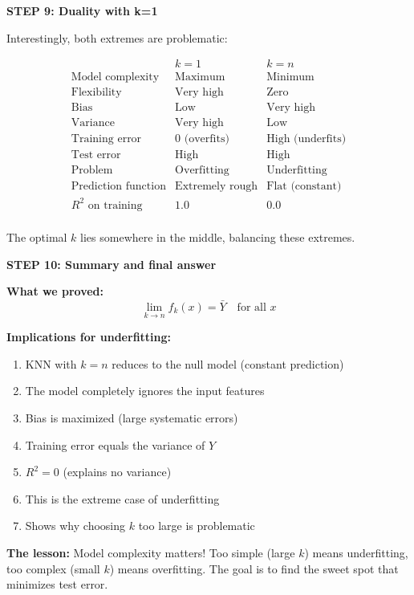 \documentclass[12pt]{article}
\begin{document}
\begin{solution}
\textbf{STEP 9: Duality with k=1}

Interestingly, both extremes are problematic:

\[
\begin{array}{c|c|c}
& k=1 & k=n \\
\hline
\text{Model complexity} & \text{Maximum} & \text{Minimum} \\
\text{Flexibility} & \text{Very high} & \text{Zero} \\
\text{Bias} & \text{Low} & \text{Very high} \\
\text{Variance} & \text{Very high} & \text{Low} \\
\text{Training error} & 0 \text{ (overfits)} & \text{High (underfits)} \\
\text{Test error} & \text{High} & \text{High} \\
\text{Problem} & \text{Overfitting} & \text{Underfitting} \\
\text{Prediction function} & \text{Extremely rough} & \text{Flat (constant)} \\
R^2 \text{ on training} & 1.0 & 0.0 \\
\end{array}
\]

The optimal \(k\) lies somewhere in the middle, balancing these extremes.

\textbf{STEP 10: Summary and final answer}

\textbf{What we proved:}
\[
\boxed{\lim_{k \to n} \hat{f}_k(x) = \bar{Y} \quad \text{for all } x}
\]

\textbf{Implications for underfitting:}

\begin{enumerate}
    \item KNN with \(k=n\) reduces to the null model (constant prediction)
    \item The model completely ignores the input features
    \item Bias is maximized (large systematic errors)
    \item Training error equals the variance of \(Y\)
    \item \(R^2 = 0\) (explains no variance)
    \item This is the extreme case of underfitting
    \item Shows why choosing \(k\) too large is problematic
\end{enumerate}

\textbf{The lesson:} Model complexity matters! Too simple (large \(k\)) means underfitting, too complex (small \(k\)) means overfitting. The goal is to find the sweet spot that minimizes test error.
\end{solution}
\end{document}
